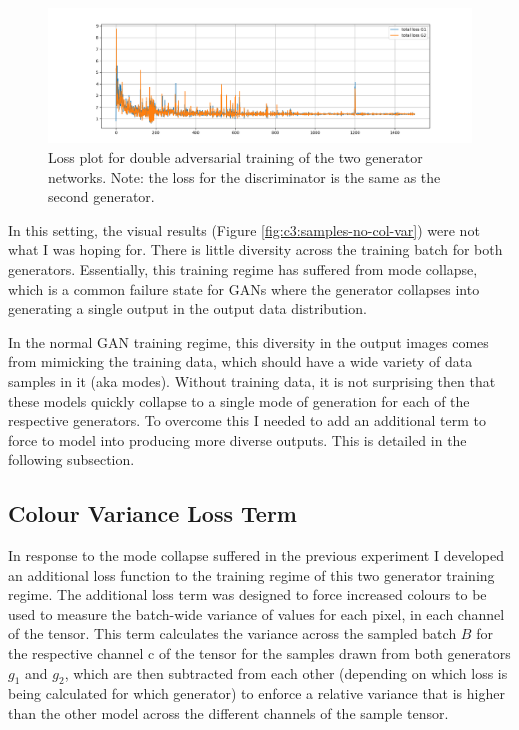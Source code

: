   \begin{figure}[!htbp]
    \centering
    \includegraphics[width=1\textwidth]{figures/c4_unstable/train_losses/no_col_var/total_loss_no_var.png}
    \caption[Loss plot for double adversarial training]{Loss plot for double adversarial training of the two generator networks. Note: the loss for the discriminator is the same as the second generator.}
  \label{fig:c3:no-var-losses}
  \end{figure}

In this setting, the visual results (Figure \ref{fig:c3:samples-no-col-var}) were not what I was hoping for.  
There is little diversity across the training batch for both generators. 
Essentially, this training regime has suffered from mode collapse, which is a common failure state for GANs where the generator collapses into generating a single output in the output data distribution. 

In the normal GAN training regime, this diversity in the output images comes from mimicking the training data, which should have a wide variety of data samples in it (aka modes). 
Without training data, it is not surprising then that these models quickly collapse to a single mode of generation for each of the respective generators. 
To overcome this I needed to add an additional term to force to model into producing more diverse outputs. 
This is detailed in the following subsection.

\subsection{Colour Variance Loss Term}

In response to the mode collapse suffered in the previous experiment I developed an additional loss function to the training regime of this two generator training regime.
The additional loss term was designed to force increased colours to be used to measure the batch-wide variance of values for each pixel, in each channel of the tensor. 
This term calculates the variance across the sampled batch $B$ for the respective channel c of the tensor for the samples drawn from both generators $g_{1}$ and $g_{2}$, which are then subtracted from each other (depending on which loss is being calculated for which generator) to enforce a relative variance that is higher than the other model across the different channels of the sample tensor.

